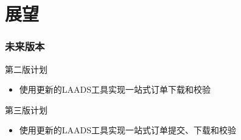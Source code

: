 \section{展望}
\begin{frame}
    \frametitle{未来版本}
    第二版计划
    \begin{itemize}
        \item 使用更新的LAADS工具实现一站式订单下载和校验
    \end{itemize}
    第三版计划
    \begin{itemize}
        \item 使用更新的LAADS工具实现一站式订单提交、下载和校验
    \end{itemize}
\end{frame}